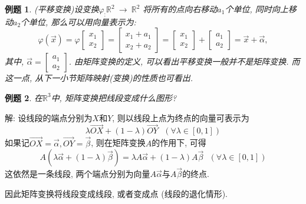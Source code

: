 \documentclass[a4paper]{book}
\newtheorem{eg}{例题}[chapter]
\begin{document}
\begin{eg}
(平移变换)设变换$\varphi_:  \mathbb{R}^2\ \rightarrow\ \mathbb{R}^2$ 将所有的点向右移动$a_1$个单位, 同时向上移动$a_2$个单位, 那么可以用向量表示为: \begin{displaymath}
\varphi(\vec{x})=\varphi\begin{bmatrix}x_1\\x_2\end{bmatrix}=\begin{bmatrix} x_1+a_1\\x_2+a_2\end{bmatrix}=\begin{bmatrix}x_1\\x_2\end{bmatrix}+\begin{bmatrix}
a_1\\a_2\end{bmatrix}=\vec{x}+\vec{\alpha},\end{displaymath}
其中, $\vec{\alpha}=\begin{bmatrix}a_1\\a_2\end{bmatrix}$. 由矩阵变换的定义, 可以看出平移变换一般并不是矩阵变换. 而这一点, 从下一小节矩阵映射(变换)的性质也可看出.
\end{eg}

\begin{eg}
在$\mathbb{R}^3$中, 矩阵变换把线段变成什么图形?
\end{eg}
解: 设线段的端点分别为$X$和$Y$, 则以线段上点为终点的向量可表示为
\begin{displaymath}
\lambda\vec{OX}+(1-\lambda)\vec{OY}\ \ \ (\forall \lambda\in[0,1])
\end{displaymath}
如果记$\vec{OX}=\vec{\alpha}, \vec{OY}=\vec{\beta}$, 则在矩阵变换$A$的作用下, 可得
\begin{displaymath}
A(\lambda\vec{\alpha}+(1-\lambda)\vec{\beta})=\lambda A\vec{\alpha}+(1-\lambda)A \vec{\beta}\ \ \ (\forall  \lambda\in[0,1])
\end{displaymath}
这依然是一条线段, 两个端点分别为向量$A\vec{\alpha}$与$A \vec{\beta}$的终点.

因此矩阵变换将线段变成线段, 或者变成点 (线段的退化情形).
\end{document}
